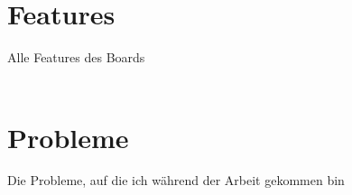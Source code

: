 \section{Features}\label{Features}
Alle Features des Boards\\
\\
%
%
%



\section{Probleme}\label{Probleme}
Die Probleme, auf die ich während der Arbeit gekommen bin\\

